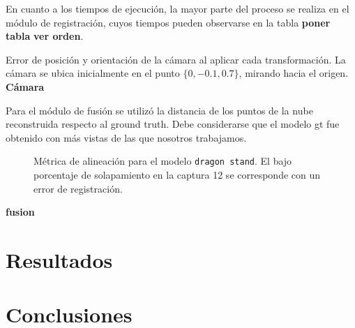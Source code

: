 \documentclass{pfc}
\newcommand{\Alerta}[1]{{\Huge\bfseries\sffamily#1}}
\begin{document}
		En cuanto a  los tiempos de ejecución,
		la mayor parte del proceso se realiza en
		el módulo de registración, cuyos tiempos
		pueden observarse en la tabla \Alerta{poner tabla} \Alerta{ver orden}.


		Error de posición y orientación de la cámara al aplicar cada transformación.
		La cámara se ubica inicialmente en el punto $\{0, -0.1, 0.7\}$, mirando hacia el origen.
		\Alerta{Cámara}

		Para el módulo de fusión se utilizó la distancia de los puntos de la
		nube reconstruida respecto al ground truth.
		Debe considerarse que el modelo gt fue obtenido con más vistas de las que nosotros trabajamos.


		

		


		\begin{figure}
			\center
				\resizebox{\linewidth}{!}{}
			\caption{\label{fig:fitness}Métrica de alineación para el modelo \texttt{dragon stand}. El bajo
			porcentaje de solapamiento en la captura 12 se corresponde
			con un error de registración.}
		\end{figure}

		\Alerta{fusion}
		

	\section{Resultados}

	\section{Conclusiones}



	
	
\end{document}
